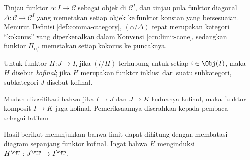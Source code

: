 \begin{contoh}\label{eg:comma-vs-cone}
	Tinjau funktor $\alpha: I \to \mathcal{C}$ sebagai objek di
	$\mathcal{C}^I$, dan tinjau pula funktor diagonal
	$\Delta: \mathcal{C} \to \mathcal{C}^I$ yang memetakan setiap objek ke
	funktor konstan yang bersesuaian. Menurut Definisi
	\ref{def:comma-category}, $(\alpha/\Delta)$ tepat merupakan kategori
	``kokonus'' yang diperkenalkan dalam Konvensi \ref{con:limit-cone}, sedangkan
	funktor $\Pi_{\alpha/}$ memetakan setiap kokonus ke puncaknya.
\end{contoh}

\begin{definisi}\label{def:cofinal} 
	Untuk funktor $H: J \to I$, jika $(i/H)$ terhubung untuk setiap
	$i \in \Obj(I)$, maka $H$ disebut \emph{kofinal}; jika $H$ merupakan
	funktor inklusi dari suatu subkategori, subkategori $J$ disebut kofinal.
\end{definisi}

Mudah diverifikasi bahwa jika $I \to J$ dan $J \to K$ keduanya kofinal, maka
funktor komposit $I \to K$ juga kofinal. Pemeriksaannya diserahkan kepada
pembaca sebagai latihan.

Hasil berikut menunjukkan bahwa limit dapat dihitung dengan membatasi diagram
sepanjang funktor kofinal. Ingat bahwa $H$ menginduksi
$H^{\opp}: J^{\opp} \to I^{\opp}$.

